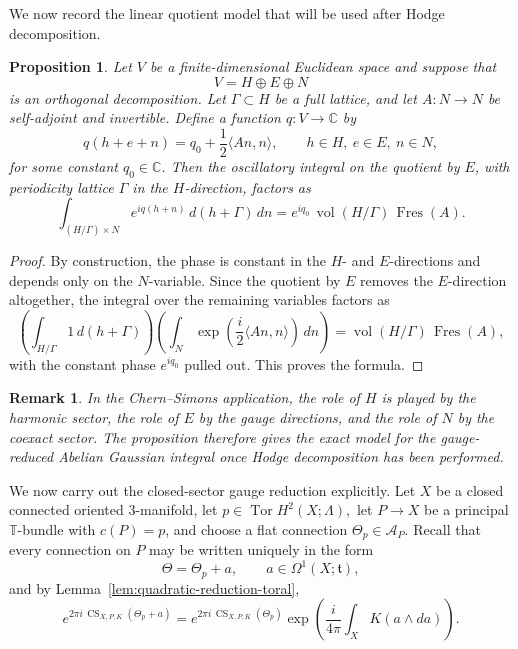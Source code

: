\documentclass[12pt]{amsart}
\numberwithin{equation}{section}
\newtheorem{prop}[theorem]{Proposition}
\newtheorem*{remark}{Remark}
\begin{document}
We now record the linear quotient model that will be used after Hodge decomposition.

\begin{prop}
\label{prop:linear-quotient-factorization}
Let \(V\) be a finite-dimensional Euclidean space and suppose that
\[
V=H\oplus E\oplus N
\]
is an orthogonal decomposition. Let \(\Gamma\subset H\) be a full lattice, and let
\(A\colon N\to N\) be self-adjoint and invertible. Define a function \(q\colon V\to \mathbb C\) by
\[
q(h+e+n)=q_0+\frac12\langle An,n\rangle,
\qquad
h\in H,\ e\in E,\ n\in N,
\]
for some constant \(q_0\in \mathbb C\). Then the oscillatory integral on the quotient by
\(E\), with periodicity lattice \(\Gamma\) in the \(H\)-direction, factors as
\[
\int_{(H/\Gamma)\times N} e^{iq(h+n)}\,d(h+\Gamma)\,dn
=
e^{iq_0}\,\operatorname{vol}(H/\Gamma)\,\operatorname{Fres}(A).
\]
\end{prop}

\begin{proof}
By construction, the phase is constant in the \(H\)- and \(E\)-directions and depends only
on the \(N\)-variable. Since the quotient by \(E\) removes the \(E\)-direction altogether, the
integral over the remaining variables factors as
\[
\left(\int_{H/\Gamma} 1\,d(h+\Gamma)\right)
\left(\int_N \exp\!\left(\frac{i}{2}\langle An,n\rangle\right)\,dn\right)
=
\operatorname{vol}(H/\Gamma)\,\operatorname{Fres}(A),
\]
with the constant phase \(e^{iq_0}\) pulled out. This proves the formula.
\end{proof}

\begin{remark}
\label{rem:finite-dimensional-model}
In the Chern--Simons application, the role of \(H\) is played by the harmonic sector,
the role of \(E\) by the gauge directions, and the role of \(N\) by the coexact sector.
The proposition therefore gives the exact model for the gauge-reduced Abelian Gaussian
integral once Hodge decomposition has been performed.
\end{remark}




We now carry out the closed-sector gauge reduction explicitly. Let \(X\) be a closed connected oriented \(3\)-manifold, let $p\in \operatorname{Tor}H^2(X;\Lambda),$ let \(P\to X\) be a principal \(\mathbb T\)-bundle with \(c(P)=p\), and choose a flat
connection \(\Theta_p\in \mathcal A_P\). Recall that every connection on \(P\) may be written uniquely in the form
\[
\Theta=\Theta_p+a,
\qquad
a\in \Omega^1(X;\mathfrak t),
\]
and by Lemma~\ref{lem:quadratic-reduction-toral},
\[
e^{2\pi i\,\operatorname{CS}_{X,P,K}(\Theta_p+a)}
=
e^{2\pi i\,\operatorname{CS}_{X,P,K}(\Theta_p)}
\exp\!\left(\frac{i}{4\pi}\int_X K(a\wedge da)\right).
\]
\end{document}
